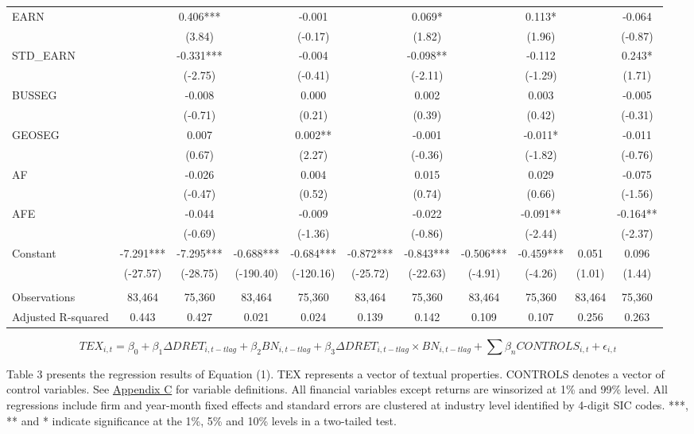 \begin{table}
\begin{center}
\begin{tabular}{lcccccccccc}
			EARN &    & 0.406*** &   & -0.001 &   & 0.069* &   & 0.113* &   & -0.064 \\
			&   & (3.84) &   & (-0.17) &   & (1.82) &   & (1.96) &   & (-0.87) \\
			STD\_EARN &    & -0.331*** &   & -0.004 &   & -0.098** &   & -0.112 &   & 0.243* \\
			&   & (-2.75) &   & (-0.41) &   & (-2.11) &   & (-1.29) &   & (1.71) \\
			BUSSEG &    & -0.008 &   & 0.000 &   & 0.002 &   & 0.003 &   & -0.005 \\
			&    & (-0.71) &   & (0.21) &   & (0.39) &   & (0.42) &   & (-0.31) \\
			GEOSEG &    & 0.007 &   & 0.002** &   & -0.001 &   & -0.011* &   & -0.011 \\
			&    & (0.67) &   & (2.27) &   & (-0.36) &   & (-1.82) &   & (-0.76) \\
			AF &    & -0.026 &   & 0.004 &   & 0.015 &   & 0.029 &   & -0.075 \\
			&    & (-0.47) &   & (0.52) &   & (0.74) &   & (0.66) &   & (-1.56) \\
			AFE &   & -0.044 &   & -0.009 &   & -0.022 &   & -0.091** &   & -0.164** \\
			&   & (-0.69) &   & (-1.36) &   & (-0.86) &   & (-2.44) &   & (-2.37) \\
			Constant & -7.291*** & -7.295*** & -0.688*** & -0.684*** & -0.872*** & -0.843*** & -0.506*** & -0.459*** & 0.051 & 0.096 \\
			&  (-27.57) & (-28.75) & (-190.40) & (-120.16) & (-25.72) & (-22.63) & (-4.91) & (-4.26) & (1.01) & (1.44) \\
			&   &   &   &   &   &   &   &   &   &  \\
			Observations & 83,464 & 75,360 & 83,464 & 75,360 & 83,464 & 75,360 & 83,464 & 75,360 & 83,464 & 75,360 \\
			Adjusted R-squared & 0.443 & 0.427 & 0.021 & 0.024 & 0.139 & 0.142 & 0.109 & 0.107 & 0.256 & 0.263 \\
			\bottomrule
			\bottomrule
		\end{tabular}%
	\end{center}
		\begin{footnotesize}
			\setcounter{equation}{0}
			\begin{equation}
				TEX_{i,t}=\beta_0+\beta_1\Delta DRET_{i,t-tlag}+\beta_2BN_{i,t-tlag}+\beta_3\Delta DRET_{i,t-tlag}\times 	BN_{i,t-tlag}+\sum\beta_nCONTROLS_{i,t}+\epsilon_{i,t}
			\end{equation}
			
			\noindent Table 3 presents the regression results of Equation (1). TEX represents a vector of textual properties. CONTROLS denotes a vector of control variables. See \hyperref[appc]{Appendix C} for variable definitions. All financial variables except returns are winsorized at 1\% and 99\% level. All regressions include firm and year-month fixed effects and standard errors are clustered at industry level identified by 4-digit SIC codes. ***, ** and * indicate significance at the 1\%, 5\% and 10\% levels in a two-tailed test.
		\end{footnotesize}
\end{table}%